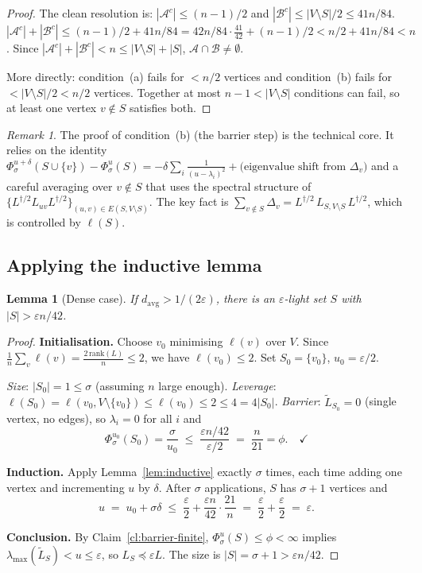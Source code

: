 \documentclass[12pt]{article}
\newtheorem{lemma}[theorem]{Lemma}
\theoremstyle{definition}
\theoremstyle{remark}
\newtheorem{remark}[theorem]{Remark}
\begin{document}
\begin{proof}
The clean resolution is: $|\mathcal{A}^c|\le(n-1)/2$ and
$|\mathcal{B}^c|\le|V\setminus S|/2\le 41n/84$.
$|\mathcal{A}^c|+|\mathcal{B}^c|\le (n-1)/2+41n/84 = 42n/84 \cdot\frac{41}{42} + (n-1)/2 < n/2+41n/84 < n$.
Since $|\mathcal{A}^c|+|\mathcal{B}^c|<n\le|V\setminus S|+|S|$, $\mathcal{A}\cap\mathcal{B}\ne\emptyset$.

More directly: condition~(a) fails for $<n/2$ vertices and condition~(b) fails for
$<|V\setminus S|/2<n/2$ vertices.  Together at most $n-1<|V\setminus S|$ conditions can
fail, so at least one vertex $v\notin S$ satisfies both.
\end{proof}

\begin{remark}
The proof of condition~(b) (the barrier step) is the technical core.
It relies on the identity
$\Phi_\sigma^{u+\delta}(S\cup\{v\}) - \Phi_\sigma^u(S)
 = -\delta\sum_i \frac{1}{(u-\lambda_i)^2}
   + \text{(eigenvalue shift from }\Delta_v)$
and a careful averaging over $v\notin S$ that uses the spectral structure
of $\{L^{\dagger/2}L_{uv}L^{\dagger/2}\}_{(u,v)\in E(S,V\setminus S)}$.
The key fact is $\sum_{v\notin S}\Delta_v
= L^{\dagger/2}\,L_{S,V\setminus S}\,L^{\dagger/2}$,
which is controlled by $\ell(S)$.
\end{remark}

\subsection{Applying the inductive lemma}

\begin{lemma}[Dense case]\label{lem:dense}
If $d_{\mathrm{avg}}>1/(2\varepsilon)$, there is an $\varepsilon$-light
set $S$ with $|S|>\varepsilon n/42$.
\end{lemma}

\begin{proof}
\textbf{Initialisation.}
Choose $v_0$ minimising $\ell(v)$ over $V$.  Since
$\frac{1}{n}\sum_v\ell(v)=\frac{2\,\mathrm{rank}(L)}{n}\le2$,
we have $\ell(v_0)\le2$.  Set $S_0=\{v_0\}$, $u_0=\varepsilon/2$.

\emph{Size}: $|S_0|=1\le\sigma$ (assuming $n$ large enough).
\emph{Leverage}: $\ell(S_0)=\ell(v_0,V\setminus\{v_0\})\le\ell(v_0)\le2\le4=4|S_0|$.
\emph{Barrier}: $\widetilde{L}_{S_0}=0$ (single vertex, no edges), so
$\lambda_i=0$ for all $i$ and
\[
  \Phi_\sigma^{u_0}(S_0)=\frac{\sigma}{u_0}
  \;\le\;
  \frac{\varepsilon n/42}{\varepsilon/2}
  \;=\;
  \frac{n}{21}=\phi. \quad\checkmark
\]

\textbf{Induction.}
Apply Lemma~\ref{lem:inductive} exactly $\sigma$ times, each time adding
one vertex and incrementing $u$ by $\delta$.  After $\sigma$ applications,
$S$ has $\sigma+1$ vertices and
\[
  u \;=\; u_0+\sigma\delta
    \;\le\; \frac{\varepsilon}{2}+\frac{\varepsilon n}{42}\cdot\frac{21}{n}
    \;=\;   \frac{\varepsilon}{2}+\frac{\varepsilon}{2}
    \;=\;   \varepsilon.
\]

\textbf{Conclusion.}
By Claim~\ref{cl:barrier-finite},
$\Phi_\sigma^{u}(S)\le\phi<\infty$ implies $\lambda_{\max}(\widetilde{L}_S)<u\le\varepsilon$,
so $L_S\preceq\varepsilon L$.
The size is $|S|=\sigma+1>\varepsilon n/42$.
\end{proof}
\end{document}
